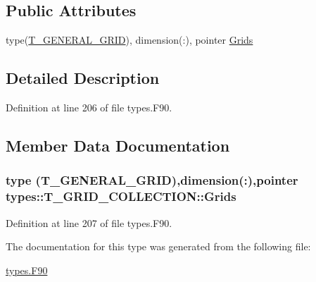 \subsection*{Public Attributes}
\begin{DoxyCompactItemize}
\item 
type(\hyperlink{typetypes_1_1_t___g_e_n_e_r_a_l___g_r_i_d}{T\_\-GENERAL\_\-GRID}), dimension(:), pointer \hyperlink{typetypes_1_1_t___g_r_i_d___c_o_l_l_e_c_t_i_o_n_a242c7fc1af2aa1827dafbed6f1c70cfd}{Grids}
\end{DoxyCompactItemize}


\subsection{Detailed Description}


Definition at line 206 of file types.F90.



\subsection{Member Data Documentation}
\hypertarget{typetypes_1_1_t___g_r_i_d___c_o_l_l_e_c_t_i_o_n_a242c7fc1af2aa1827dafbed6f1c70cfd}{
\subsubsection[{Grids}]{\setlength{\rightskip}{0pt plus 5cm}type ({\bf T\_\-GENERAL\_\-GRID}),dimension(:),pointer {\bf types::T\_\-GRID\_\-COLLECTION::Grids}}}
\label{typetypes_1_1_t___g_r_i_d___c_o_l_l_e_c_t_i_o_n_a242c7fc1af2aa1827dafbed6f1c70cfd}


Definition at line 207 of file types.F90.



The documentation for this type was generated from the following file:\begin{DoxyCompactItemize}
\item 
\hyperlink{types_8_f90}{types.F90}\end{DoxyCompactItemize}
